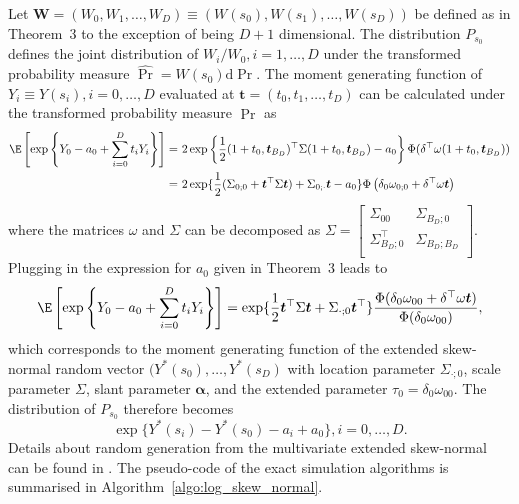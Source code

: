 \documentclass[12pt]{article}
\begin{document}
Let $\bm W = (W_0, W_1, \ldots, W_D) \equiv \left( W(s_0), W(s_1), \ldots, W(s_D)\right)$ be defined as in Theorem~3 to the exception of being $D+1$ dimensional.
The distribution $P_{s_0}$ defines the joint distribution of $W_i/W_0, i=1,\dots,D$ under the transformed probability measure $\hat \Pr = W(s_0)\text{d}\Pr$. The moment generating function of $Y_i \equiv Y(s_i),i=0,\dots,D$ evaluated at $\bm t = (t_0, t_1, \ldots, t_D)$ can be calculated under the transformed probability measure $\hat\Pr$ as
\begin{align*}
	\E\left[\exp\left\{Y_0-a_0 + \sum_{i=0}^D t_i Y_i\right\}\right]
	=&\ 2\exp\left\{\frac{1}{2}(1+t_0,\bm t_{B_D})^\top\Sigma(1+t_0,\bm t_{B_D})-a_0 \right\} \Phi(\delta^\top\omega(1+t_0,\bm t_{B_D}))\\
	 =&\ 2\exp\{\frac{1}{2}(\Sigma_{0;0} + \bm t^\top\Sigma \bm t) + \Sigma_{0;\cdot} \bm t - a_0\}\Phi\left(\delta_0\omega_{0;0} + \delta^\top\omega \bm t\right) 
\end{align*}        
where the matrices $\omega$ and $\Sigma$ can be decomposed as $\Sigma = \begin{bmatrix}
	\Sigma_{00} & \Sigma_{B_D;0} \\
	\Sigma_{B_D;0}^\top & \Sigma_{B_D;B_D} \\
\end{bmatrix}$. 
%
Plugging in the expression for $a_0$ given in Theorem~3 leads to 
%
\begin{equation*}
\E\left[\exp\left\{Y_0-a_0 + \sum_{i=0}^D t_i Y_i\right\}\right] = \exp\{\frac{1}{2} \bm t^\top\Sigma \bm t + \Sigma_{\cdot;0} \bm t^\top \} 
\frac{\Phi(\delta_0\omega_{00} + \delta^\top\omega \bm t)}{\Phi(\delta_0\omega_{00})}, 
\end{equation*}
%
which corresponds to the moment generating function of the extended skew-normal random vector $(Y^*(s_0),\ldots,Y^*(s_D)$ with location parameter $\Sigma_{\cdot;0}$, scale parameter $\Sigma$, slant parameter $\bm\alpha$, and the extended parameter $\tau_0 = \delta_0\omega_{00}$. The distribution of $P_{s_0}$ therefore becomes 
%
$$\exp\{Y^*(s_i)-Y^*(s_0)-a_i + a_0\}, i=0,\dots,D.$$
%
Details about random generation from the multivariate extended skew-normal can be found in \cite[Chapter 5.3.3]{Azzalini:2013}. The pseudo-code of the exact simulation algorithms is summarised in Algorithm~\ref{algo:log_skew_normal}.   
\end{document}
